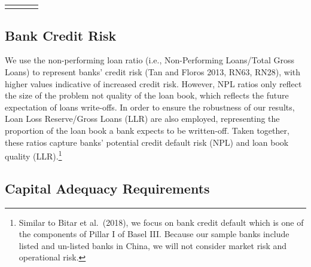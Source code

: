 \documentclass{article}
\begin{document}
\begin{longtable}[c]{|p{2.14in}|p{1.24in}|p{16.73in}|p{5.13in}}
\noalign{\global\setlength{\arrayrulewidth}{2pt}}\arrayrulecolor[HTML]{666666}\cline{1-4}

\end{longtable}

\hypertarget{bank-credit-risk}{%
\subsection{Bank Credit Risk}\label{bank-credit-risk}}

We use the non-performing loan ratio (i.e., Non-Performing Loans/Total
Gross Loans) to represent banks' credit risk (Tan and Floros 2013, RN63,
RN28), with higher values indicative of increased credit risk. However,
NPL ratios only reflect the size of the problem not quality of the loan
book, which reflects the future expectation of loans write-offs. In
order to ensure the robustness of our results, Loan Loss Reserve/Gross
Loans (LLR) are also employed, representing the proportion of the loan
book a bank expects to be written-off. Taken together, these ratios
capture banks' potential credit default risk (NPL) and loan book quality
(LLR).\footnote{Similar to Bitar et al.~(2018), we focus on bank credit
  default which is one of the components of Pillar I of Basel III.
  Because our sample banks include listed and un-listed banks in China,
  we will not consider market risk and operational risk.}

\hypertarget{capital-adequacy-requirements}{%
\subsection{Capital Adequacy
Requirements}\label{capital-adequacy-requirements}}
\end{document}
